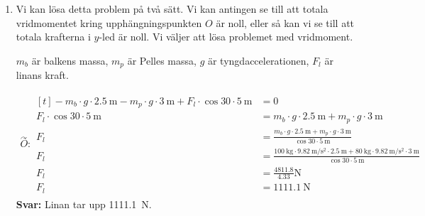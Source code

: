 \documentclass[11pt]{article}
\begin{document}
\begin{enumerate}[itemsep=2em]
        \item
              Vi kan lösa detta problem på två sätt. Vi kan antingen se till att totala vridmomentet kring upphängningspunkten $O$ är noll, eller så kan vi se till att totala krafterna i $y$-led är noll. Vi väljer att lösa problemet med vridmoment.

              $m_b$ är balkens massa, $m_p$ är Pelles massa, $g$ är tyngdaccelerationen, $F_l$ är linans kraft.

              \begin{align*}
                      \overset{\curvearrowright}{O} : \begin{aligned}[t]
                                                              - m_b \cdot g \cdot \SI{2.5}{\meter} - m_p \cdot g \cdot \SI{3}{\meter} + F_{l} \cdot \cos{30} \cdot \SI{5}{\meter} & = 0                                                                                                                                                                                                          \\
                                                              F_l \cdot \cos{30} \cdot \SI{5}{\meter}                                                                             & = m_b \cdot g \cdot \SI{2.5}{\meter} + m_p \cdot g \cdot \SI{3}{\meter}                                                                                                                                      \\
                                                              F_l                                                                                                                 & = \frac{m_b \cdot g \cdot \SI{2.5}{\meter} + m_p \cdot g \cdot \SI{3}{\meter}}{\cos{30} \cdot \SI{5}{\meter}}                                                                                                \\
                                                              F_l                                                                                                                 & = \frac{\SI{100}{\kilogram} \cdot \SI{9.82}{\meter/\second\squared} \cdot \SI{2.5}{\meter} + \SI{80}{\kilogram} \cdot \SI{9.82}{\meter/\second\squared} \cdot \SI{3}{\meter}}{\cos{30} \cdot \SI{5}{\meter}} \\
                                                              F_l &= \frac{4811.8}{4.33} \mathrm{N} \\
                                                              F_l &= \SI{1111.1}{\newton}
                                                      \end{aligned}
              \end{align*}
              \textbf{Svar:} Linan tar upp \SI{1111.1}{\newton}.

\end{enumerate}
\end{document}
